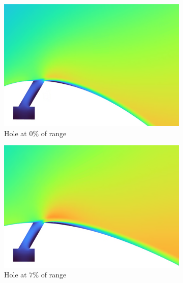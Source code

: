 \documentclass[a4paper, 11pt, oneside]{report}
\begin{document}
\begin{figure}[H]
	\centering
	\begin{subfigure}{.42\textwidth}
		\centering
		\includegraphics[width=\linewidth]{figs/sch_detail_mach_contours_0.png}
		\caption{Hole at $0\%$ of range}
		\vspace{0.018\textheight}
	\end{subfigure}
	\hspace{0.05\textwidth}
	\begin{subfigure}{.42\textwidth}
		\centering
		\includegraphics[width=\linewidth]{figs/sch_detail_mach_contours_1.png}
		\caption{Hole at $7\%$ of range}
		\vspace{0.018\textheight}
	\end{subfigure}
	\begin{subfigure}{.42\textwidth}
		\centering

\end{subfigure}
\end{figure}
\end{document}

